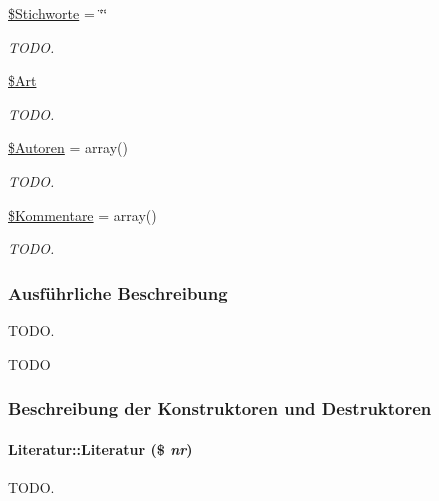 \begin{CompactItemize}
\hyperlink{classLiteratur_aa77f0f697d4bcf72279aadedd91ddff}{\$Stichworte} = \char`\"{}\char`\"{}
\begin{CompactList}\small\item\em TODO. \item\end{CompactList}\item 
\hyperlink{classLiteratur_fb4d4b1ce29a33a10e3e27d47f31a447}{\$Art}
\begin{CompactList}\small\item\em TODO. \item\end{CompactList}\item 
\hyperlink{classLiteratur_01b311917d78c1dbb346435598ebba64}{\$Autoren} = array()
\begin{CompactList}\small\item\em TODO. \item\end{CompactList}\item 
\hyperlink{classLiteratur_ebcaeb5c38ce2677a14189da511fa663}{\$Kommentare} = array()
\begin{CompactList}\small\item\em TODO. \item\end{CompactList}\end{CompactItemize}


\subsubsection{Ausf\"{u}hrliche Beschreibung}
TODO. 

TODO 



\subsubsection{Beschreibung der Konstruktoren und Destruktoren}
\hypertarget{classLiteratur_55626b912da4c041eaf981781ed6c640}{
\paragraph[Literatur]{\setlength{\rightskip}{0pt plus 5cm}Literatur::Literatur (\$ {\em nr})}\hfill}
\label{classLiteratur_55626b912da4c041eaf981781ed6c640}


TODO. 

